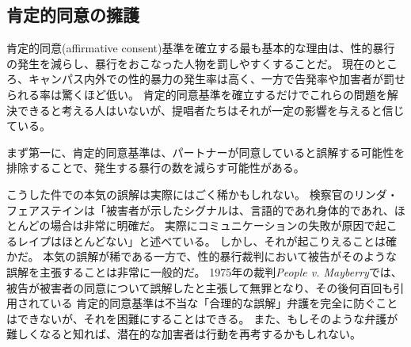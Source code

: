 \documentclass[paper=a4,book,openany]{jlreq}
\newcommand{\ig}[1]{}           %
\begin{document}
\subsection{肯定的同意の擁護}

肯定的同意(affirmative consent)基準を確立する最も基本的な理由は、性的暴行の発生を減らし、暴行をおこなった人物を罰しやすくすることだ。
現在のところ、キャンパス内外での性的暴力の発生率は高く、一方で告発率や加害者が罰せられる率は驚くほど低い。
肯定的同意基準を確立するだけでこれらの問題を解決できると考える人はいないが、提唱者たちはそれが一定の影響を与えると信じている。

まず第一に、肯定的同意基準は、パートナーが同意していると誤解する可能性を排除することで、発生する暴行の数を減らす可能性がある。

こうした件での本気の誤解は実際にはごく稀かもしれない。
検察官のリンダ・フェアステイン\ig{Linda Fairstein}は「被害者が示したシグナルは、言語的であれ身体的であれ、ほとんどの場合は非常に明確だ。
実際にコミュニケーションの失敗が原因で起こるレイプはほとんどない」と述べている\citep{fairstein94:_panel_discus_men_women_rape}。
しかし、それが起こりえることは確かだ。
本気の誤解が稀である一方で、性的暴行裁判において被告がそのような誤解を主張することは非常に一般的だ。
1975年の裁判\emph{People v. Mayberry}では、被告が被害者の同意について誤解したと主張して無罪となり、その後何百回も引用されている
肯定的同意基準は不当な「合理的な誤解」弁護を完全に防ぐことはできないが、それを困難にすることはできる。
また、もしそのような弁護が難しくなると知れば、潜在的な加害者は行動を再考するかもしれない。
\end{document}
